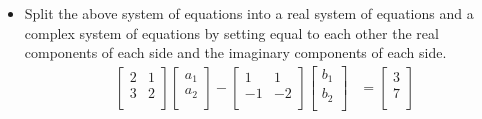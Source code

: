 \documentclass{article}
\begin{document}
\begin{itemize}
\begin{equation*}
            +
            \begin{bmatrix}
                1 & 1\\
                -1 & -2\\
            \end{bmatrix}
            \begin{bmatrix}
                a_1\\
                a_2\\
            \end{bmatrix}
        \right) =
        \begin{bmatrix}
            3\\
            7\\
        \end{bmatrix}
        +i
        \begin{bmatrix}
            6\\
            -1\\
        \end{bmatrix}
    \end{equation*}
    \item Split the above system of equations into a real system of equations and a complex system of equations by setting equal to each other the real components of each side and the imaginary components of each side.
    \begin{align*}
        \begin{bmatrix}
            2 & 1\\
            3 & 2\\
        \end{bmatrix}
        \begin{bmatrix}
            a_1\\
            a_2\\
        \end{bmatrix}
        -
        \begin{bmatrix}
            1 & 1\\
            -1 & -2\\
        \end{bmatrix}
        \begin{bmatrix}
            b_1\\
            b_2\\
        \end{bmatrix}
        &=
        \begin{bmatrix}
            3\\
            7\\
        \end{bmatrix}\\

\end{align*}
\end{itemize}
\end{document}
